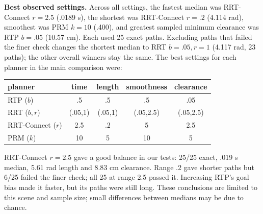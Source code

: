 \textbf{Best observed settings.} Across all settings, the fastest median was RRT-Connect $r=2.5$ (.0189 s), the shortest was RRT-Connect $r=.2$ (4.114 rad), smoothest was PRM $k=10$ (.400), and greatest sampled minimum clearance was RTP $b=.05$ (10.57 cm). Each used 25 exact paths. Excluding paths that failed the finer check changes the shortest median to RRT $b=.05,r=1$ (4.117 rad, 23 paths); the other overall winners stay the same. The best settings for each planner in the main comparison were:
\begin{center}\scriptsize
\begin{tabular}{lcccc}\toprule
planner & time & length & smoothness & clearance\\\midrule
RTP ($b$) & .5 & .5 & .5 & .05\\
RRT ($b,r$) & (.05,1)&(.05,1)&(.05,2.5)&(.05,2.5)\\
RRT-Connect ($r$)&2.5&.2&5&2.5\\
PRM ($k$)&10&5&10&5\\\bottomrule
\end{tabular}
\end{center}
RRT-Connect $r=2.5$ gave a good balance in our tests: 25/25 exact, .019 s median, 5.61 rad length and 8.83 cm clearance. Range .2 gave shorter paths but 6/25 failed the finer check; all 25 at range 2.5 passed it. Increasing RTP's goal bias made it faster, but its paths were still long. These conclusions are limited to this scene and sample size; small differences between medians may be due to chance.
